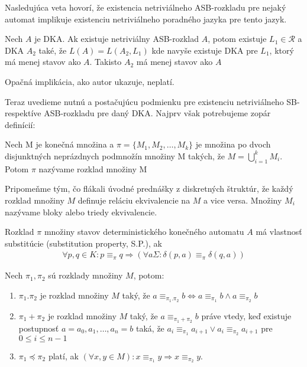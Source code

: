Nasledujúca veta hovorí, že existencia netriviálneho ASB-rozkladu pre nejaký automat implikuje existenciu netriviálneho poradného jazyka pre tento jazyk.

\begin{theorem}
Nech $ A $ je DKA. Ak existuje netriviálny ASB-rozklad $ A $, potom existuje $ L_1 \in \mathscr{R}$ a DKA $ A_2 $ také, že $ L(A) = L(A_2, L_1) $ kde navyše existuje DKA pre $ L_1 $, ktorý má menej stavov ako $ A $. Takisto $ A_2 $ má menej stavov ako $ A $
\end{theorem}

Opačná implikácia, ako autor ukazuje, neplatí.
\par
Teraz uvedieme nutnú a postačujúcu podmienku pre existenciu netriviálneho SB- respektíve ASB-rozkladu pre daný DKA. Najprv však potrebujeme zopár definícií:

\begin{definition}
Nech M je konečná množina a $ \pi = \lbrace M_1,M_2, \ldots , M_k \rbrace $ je množina po dvoch disjunktných neprázdnych podmnožín množiny M takých, že $ M = \bigcup^k_{i=1} M_i $. Potom $ \pi $ nazývame rozklad množiny M
\end{definition}

Pripomeňme tým, čo flákali úvodné prednášky z diskretných štruktúr, že každý rozklad množiny $ M $ definuje reláciu ekvivalencie na $ M $ a vice versa. Množiny $ M_i $ nazývame bloky alebo triedy ekvivalencie.

\begin{definition}
Rozklad $ \pi $  množiny stavov deterministického konečného automatu $ A $ má vlastnosť substitúcie (substitution property, S.P.), ak
\begin{align*}
\forall p,q \in K: p \equiv_{\pi} q \Rightarrow (\forall a \Sigma: \delta(p,a) \equiv_{\pi} \delta(q,a))
\end{align*}
\end{definition}

\begin{definition}
Nech $ \pi_1,\pi_2 $ sú rozklady množiny $ M $, potom:

\begin{enumerate}[label=(\alph*)]
  \item $ \pi_1.\pi_2 $ je rozklad množiny $ M $ taký, že $ a \equiv_{\pi_1.\pi_2} b \Leftrightarrow  a \equiv_{\pi_1} b \wedge a \equiv_{\pi_2} b $
  \item $ \pi_1 + \pi_2 $ je rozklad množiny $ M $ taký, že $ a \equiv_{\pi_1+\pi_2} b $ práve vtedy, keď existuje postupnosť $ a=a_0,a_1, \ldots ,a_n = b $ taká, že $ a_i \equiv_{\pi_1} a_{i+1} \vee a_i \equiv_{\pi_2} a_{i+1}$ pre $ 0 \leq i \leq n-1 $
  \item $ \pi_1 \preceq \pi_2 $ platí, ak $ (\forall x,y \in M):  x \equiv_{\pi_1} y \Rightarrow x \equiv_{\pi_2} y$.
\end{enumerate}
\end{definition}

